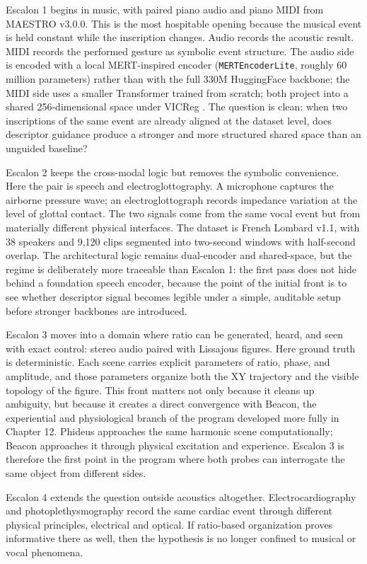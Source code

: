 Escalon 1 begins in music, with paired piano audio and piano MIDI from MAESTRO v3.0.0. This is the most hospitable opening because the musical event is held constant while the inscription changes. Audio records the acoustic result. MIDI records the performed gesture as symbolic event structure. The audio side is encoded with a local MERT-inspired encoder (\texttt{MERTEncoderLite}, roughly 60 million parameters) rather than with the full 330M HuggingFace backbone; the MIDI side uses a smaller Transformer trained from scratch; both project into a shared 256-dimensional space under VICReg \parencite{li_2024,bardes_2022}. The question is clean: when two inscriptions of the same event are already aligned at the dataset level, does descriptor guidance produce a stronger and more structured shared space than an unguided baseline?

Escalon 2 keeps the cross-modal logic but removes the symbolic convenience. Here the pair is speech and electroglottography. A microphone captures the airborne pressure wave; an electroglottograph records impedance variation at the level of glottal contact. The two signals come from the same vocal event but from materially different physical interfaces. The dataset is French Lombard v1.1, with 38 speakers and 9,120 clips segmented into two-second windows with half-second overlap. The architectural logic remains dual-encoder and shared-space, but the regime is deliberately more traceable than Escalon 1: the first pass does not hide behind a foundation speech encoder, because the point of the initial front is to see whether descriptor signal becomes legible under a simple, auditable setup before stronger backbones are introduced.

Escalon 3 moves into a domain where ratio can be generated, heard, and seen with exact control: stereo audio paired with Lissajous figures. Here ground truth is deterministic. Each scene carries explicit parameters of ratio, phase, and amplitude, and those parameters organize both the XY trajectory and the visible topology of the figure. This front matters not only because it cleans up ambiguity, but because it creates a direct convergence with Beacon, the experiential and physiological branch of the program developed more fully in Chapter 12. Phideus approaches the same harmonic scene computationally; Beacon approaches it through physical excitation and experience. Escalon 3 is therefore the first point in the program where both probes can interrogate the same object from different sides.

Escalon 4 extends the question outside acoustics altogether. Electrocardiography and photoplethysmography record the same cardiac event through different physical principles, electrical and optical. If ratio-based organization proves informative there as well, then the hypothesis is no longer confined to musical or vocal phenomena.

